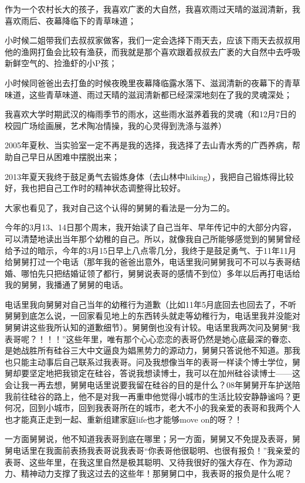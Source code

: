 \documentclass[9pt, b5paper]{article}
\begin{document}
作为一个农村长大的孩子，我喜欢广袤的大自然，我喜欢雨过天晴的滋润清新，我喜欢雨后、夜幕降临下的青草味道；

小时候二姐带我们去叔叔家做客，我们一定会选择下雨天去，应该下雨天去叔叔用他的渔网打鱼会比较有渔获，而我就是那个喜欢跟着叔叔去广袤的大自然中去呼吸新鲜空气的、捡渔虾的小P孩；

小时候同爸爸出去打鱼的时候夜晚里夜幕降临露水落下、滋润清新的夜幕下的青草味道，这些青草味道、雨过天晴的滋润清新都已经深深地刻在了我的灵魂深处；

我喜欢大学时期武汉的梅雨季节的雨水，这些雨水滋养着我的灵魂（和12月7日的校园广场绘画展，艺术陶冶情操，我的心灵得到洗涤与滋养）

2005年夏秋、当实验室一定不再是我的选择，我选择了去山青水秀的广西养病，帮助自己早日从困难中摆脱出来；

2013年夏天我终于鼓足勇气去锻炼身体（去山林中hiking），我把自己锻炼得比较好，我也把自己工作时的精神状态调整得比较好。

大家也看见了，我对自己这个认得的舅舅的看法是一分为二的。

今年的3月13、14日那个周末，我开始读了自己当年、早年传记中的大部分内容，可以清楚地读出当年那个幼稚的自己。所以，就像我自己所能够感觉到的舅舅曾经给予过的暗示，今年的3月15日早上八点零几分，我终于是鼓足勇气、于11年11月给舅舅打过一个电话（那年我的爸爸出意外，电话里我问舅舅我可不可以与表哥结婚、哪怕先只把结婚证领了都行，舅舅说表哥的感情不到位）多年以后再打电话给我的舅舅，我播通了舅舅的电话。 

电话里我向舅舅对自己当年的幼稚行为道歉（比如11年5月底回去也回去了，不听舅舅到底怎么说，一回家看见地上的东西转头就走等幼稚行为，电话里我并没能对舅舅讲这些我所认知的道歉细节）。舅舅倒也没有计较。电话里我两次问及舅舅“我表哥呢？！！！”这些年里，唯有那个心心恋恋的表哥仍然是她心底最深的眷恋、是她战胜所有硅谷三大中文逼良为娼黑势力的源动力，舅舅只答说他不知道。那我也只能主动事后自己联系过我表哥。问及我想像当年的表哥一样读个博士学位，舅舅却要坚定地把我锁定在硅谷，答说我想读博士，我可以在加州硅谷读博士——这会让我一再去想，舅舅电话里说要我留在硅谷的目的是什么？08年舅舅开车护送陪我前往硅谷的路上，他不是对我一再重申他觉得小城市的生活比较安静静谧吗？更何况，回到小城市，回到我表哥所在的城市，老大不小的我亲爱的表哥和我两个人也才能真正走到一起、重新组建家庭life也才能够move on的呀？！

一方面舅舅说，他不知道我表哥到底在哪里；另一方面，舅舅又不免提及表哥，舅舅电话里在我面前表扬我表哥说我表哥“你表哥他很聪明、也很有报负！”我亲爱的表哥、这些年里，在我这里自然是极其聪明、又待我很好的强大存在、作为源动力、精神动力支撑了我这过去的这些年！那舅舅口中，我表哥的报负是什么呢？
\end{document}
